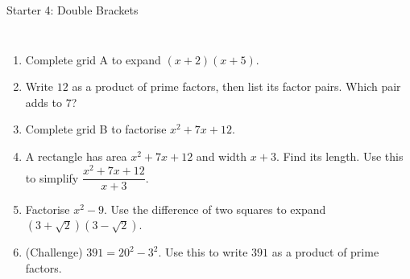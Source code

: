 \documentclass{beamer}
\newcommand{\ashow}[1]{\uncover<2->{\textcolor{red}{\small #1}}}
\newcommand{\tightlist}{%
  \setlength{\itemsep}{0pt}\setlength{\parskip}{0pt}\setlength{\topsep}{0pt}%
}
\begin{document}
\begin{frame}[t]{Starter 4: Double Brackets}
\begin{columns}[T,onlytextwidth]
\vspace{-1.5em}
\footnotesize
\begin{enumerate}\tightlist
{}
  \item Complete grid A to expand $(x+2)(x+5)$.
        \ashow{$x^2+7x+10$}
  \item Write $12$ as a product of prime factors, then list its factor pairs. Which pair
        adds to $7$?
        \ashow{$2^2\times3$; \; $1\times12$, $2\times6$, $3\times4$; \; $3+4=7$}
  \item Complete grid B to factorise $x^2+7x+12$.
        \ashow{$(x+3)(x+4)$, in either order}
  \item A rectangle has area $x^2+7x+12$ and width $x+3$. Find its length.
        Use this to simplify $\dfrac{x^2+7x+12}{x+3}$.\\[2pt]
        \ashow{$\dfrac{(x+3)(x+4)}{x+3}=x+4$}
  \item Factorise $x^2-9$. Use the difference of two squares to expand
        $(3+\sqrt{2})(3-\sqrt{2})$.
        \ashow{$(x+3)(x-3)$; \; $9-2=7$}
  \item (Challenge) $391=20^2-3^2$. Use this to write $391$ as a product of prime factors.
        \ashow{$(20+3)(20-3)=23\times17$, both prime}
\end{enumerate}
\end{columns}
\end{frame}
\end{document}
